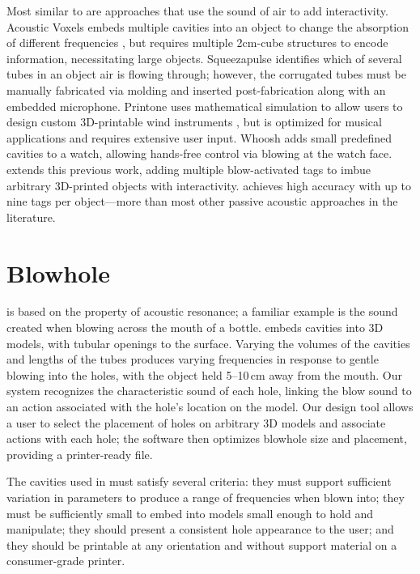         Most similar to \bh are approaches that use the sound of air
				to add interactivity. Acoustic Voxels embeds multiple cavities
				into an object to change the absorption of different
				frequencies \cite{Li:2016bt}, but requires multiple 2cm-cube
				structures to encode information, necessitating large objects.
				Squeezapulse \cite{He:2017jc} identifies which of several
				tubes in an object air is flowing through; however, the
				corrugated tubes must be manually fabricated via molding and
				inserted post-fabrication along with an embedded microphone.
				Printone uses mathematical simulation to allow users to design
				custom 3D-printable wind instruments \cite{Umetani:2016es},
				but is optimized for musical applications and requires
				extensive user input. Whoosh \cite{Reyes:2016iy} adds small
				predefined cavities to a watch, allowing hands-free control
				via blowing at the watch face. \bh extends this previous work,
				adding multiple blow-activated tags to imbue arbitrary
				3D-printed objects with interactivity. \bh achieves high
				accuracy with up to nine tags per object---more than most
				other passive acoustic approaches in the literature.

  \section{Blowhole}
    \bh is based on the property of acoustic resonance; a familiar example is
    the sound created when blowing across the mouth of a bottle. \bh embeds
    cavities into 3D models, with tubular openings to the surface. Varying the
    volumes of the cavities and lengths of the tubes produces varying
    frequencies in response to gentle blowing into the holes, with the object
    held 5--10\,cm away from the mouth. Our system recognizes the characteristic
    sound of each hole, linking the blow sound to an action associated with the
    hole's location on the model. Our design tool allows a user to select the
    placement of holes on arbitrary 3D models and associate actions with each
    hole; the software then optimizes blowhole size and placement, providing a
    printer-ready file.
    
    The cavities used in \bh must satisfy several criteria: they must support
    sufficient variation in parameters to produce a range of frequencies when
    blown into; they must be sufficiently small to embed into models small
    enough to hold and manipulate; they should present a consistent hole
    appearance to the user; and they should be printable at any orientation and
    without support material on a consumer-grade printer.
    
